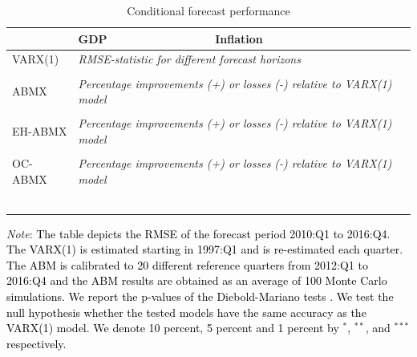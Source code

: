 \begin{table}[!h]
	\caption{Conditional forecast performance} 
	\label{table:rmse_ed_validation_abmx}
	\centering
		\begin{tabular}{lll}
			\toprule
			& GDP & Inflation \\
			\midrule
			VARX(1) & \multicolumn{2}{l}{\textit{RMSE-statistic for different forecast horizons}} \\ \midrule
			
            \\ \midrule
   			ABMX & \multicolumn{2}{l}{\textit{Percentage improvements (+) or losses (-) relative to VARX(1) model}} \\	\midrule 
			\\ \midrule 
            EH-ABMX & \multicolumn{2}{l}{\textit{Percentage improvements (+) or losses (-) relative to VARX(1) model}} \\	\midrule 
			\\ \midrule 
			OC-ABMX & \multicolumn{2}{l}{\textit{Percentage improvements (+) or losses (-) relative to VARX(1) model}} \\	\midrule 
			\\ \bottomrule \
		\end{tabular}
	\begin{tablenotes}
		\footnotesize \item \textit{Note}: \textcolor{black}{The table depicts the RMSE of the forecast period 2010:Q1 to 201\textcolor{black}{6}:Q4. The VARX(1) is estimated starting in 1997:Q1 and is re-estimated each quarter. The ABM is calibrated to \textcolor{black}{20} different reference quarters from 2012:Q1 to \textcolor{black}{2016:Q4} and the ABM results are obtained as an average of 100 Monte Carlo simulations. We report the p-values of the Diebold-Mariano tests \citep{harveyTestingEqualityPrediction1997}.  We test the null hypothesis whether the tested models have the same accuracy as the VARX(1) model. We denote  10 percent, 5 percent and 1 percent by $^{*}$, $^{**}$, and $^{***}$ respectively.}
	\end{tablenotes}
\end{table}

